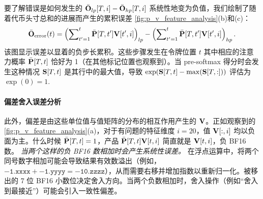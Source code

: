 \documentclass{article} %
\begin{document}
要了解错误是如何发生的 $\bar{{\mathbf{O}}}_{lp}[T, i] - \bar{{\mathbf{O}}}_{hp}[T, i]$ 系统性地变为负值，我们绘制了随着代币头寸总和的进展而产生的累积误差 \cref{fig:p_v_feature_analysis}(b)和(c)：
\begin{equation}
\bar{{\mathbf{O}}}_{\text{error}}(t) 
= \left( \sum\nolimits_{t^\prime=1}^{t} \bar{{\mathbf{P}}}[T, t^\prime]{\mathbf{V}}[t^\prime, i] \right)_{lp} 
- \left( \sum\nolimits_{t^\prime=1}^{t} \bar{{\mathbf{P}}}[T, t^\prime]{\mathbf{V}}[t^\prime, i] \right)_{hp}.
\end{equation}
该图显示误差以显着的负步长累积。这些步骤发生在令牌位置 $t$ 其中相应的注意力概率 $\bar{{\mathbf{P}}}[T, t]$ 恰好为 1（在其他标记位置也观察到）。当 pre-softmax 得分时会发生这种情况 ${\mathbf{S}}[T, t]$ 是其行中的最大值，导致 $\exp({\mathbf{S}}[T, t] - \max({\mathbf{S}}[T, :]))$ 评估为 $\exp(0)=1$.

\paragraph{偏差舍入误差分析}
此外，偏差是由这些单位值与值矩阵的分布的相互作用产生的 ${\mathbf{V}}$。正如观察到的 \cref{fig:p_v_feature_analysis}(a)，对于有问题的特征维度 $i=20$，值 ${\mathbf{V}}[:, i]$ 均以负面为主。什么时候 $\bar{{\mathbf{P}}}[T, t]=1$，产品 $\bar{{\mathbf{P}}}[T, t]{\mathbf{V}}[t, i]$ 简直就是 ${\mathbf{V}}[t, i]$，负 BF16 数。
\emph{当两个这样的负 BF16 数相加时会产生系统性误差。} 在浮点运算中，将两个同号数字相加可能会导致结果有效数溢出（例如， $\mathtt{-1.xxxx} + \mathtt{-1.yyyy}=\mathtt{-10.zzzz}$），从而需要右移并增加指数以重新归一化。被移出的 7 位 BF16 小数位决定舍入方向。当两个负数相加时，舍入操作（例如“舍入到最接近”）可能会引入一致性偏差。
\end{document}
